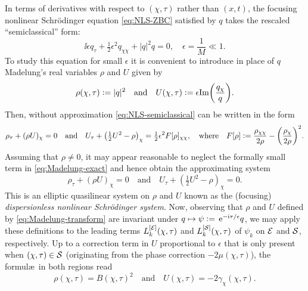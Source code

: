 In terms of derivatives with respect to $(\chi,\tau)$ rather than $(x,t)$, the focusing nonlinear Schr\"odinger equation \eqref{eq:NLS-ZBC} satisfied by $q$ takes the rescaled ``semiclassical'' form:
\begin{equation}
\ii\epsilon q_\tau +\tfrac{1}{2}\epsilon^2q_{\chi\chi} + |q|^2q=0,\quad\epsilon=\frac{1}{M}\ll 1.
\label{eq:NLS-semiclassical}
\end{equation}
To study this equation for small $\epsilon$ it is convenient to introduce in place of $q$ Madelung's real variables $\rho$ and $U$ given by
\begin{equation}
\rho(\chi,\tau)\defeq |q|^2\quad\text{and}\quad U(\chi,\tau)\defeq \epsilon\mathrm{Im}\left(\frac{q_\chi}{q}\right).
\label{eq:Madelung-transform}
\end{equation}
Then, without approximation \eqref{eq:NLS-semiclassical} can be written in the form
\begin{equation}
\rho_\tau+(\rho U)_\chi=0\quad\text{and}\quad U_\tau + \left(\tfrac{1}{2}U^2-\rho\right)_\chi = \tfrac{1}{2}\epsilon^2 F[\rho]_{\chi\chi},\quad\text{where}\quad
F[\rho]\defeq\frac{\rho_{\chi\chi}}{2\rho}-\left(\frac{\rho_\chi}{2\rho}\right)^2.
\label{eq:Madelung-exact}
\end{equation}
Assuming that $\rho\neq 0$, it may appear reasonable to neglect the formally small term in \eqref{eq:Madelung-exact} and hence obtain the approximating system
\begin{equation}
\rho_\tau+(\rho U)_\chi=0\quad\text{and}\quad U_\tau + \left(\tfrac{1}{2}U^2-\rho\right)_\chi = 0.
\label{eq:dispersionless-NLS}
\end{equation}
This is an elliptic quasilinear system on $\rho$ and $U$ known as the (focusing) \emph{dispersionless nonlinear Schr\"odinger system}.  Now, observing that $\rho$ and $U$ defined by \eqref{eq:Madelung-transform} are invariant under $q\mapsto \psi\vcentcolon= \,\mathrm{e}^{-\mathrm{i}\tau/\epsilon}q$, we may apply these definitions to the leading terms $L_k^{[\mathcal{E}]}(\chi,\tau)$ and $L_k^{[\mathcal{S}]}(\chi,\tau)$ of $\psi_k$ on $\mathcal{E}$ and $\mathcal{S}$, respectively.  Up to a correction term in $U$ proportional to  $\epsilon$ that is only present when $(\chi,\tau)\in\mathcal{S}$ (originating from the phase correction $-2\mu(\chi,\tau)$), the formul\ae\ in both regions read
\begin{equation}
\rho(\chi,\tau)=B(\chi,\tau)^2\quad\text{and}\quad U(\chi,\tau)=-2\gamma_\chi(\chi,\tau).
\label{eq:Madelung-transform-on-leading-term}
\end{equation}
